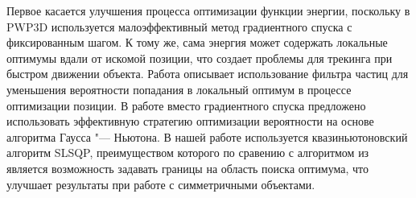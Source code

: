 Первое касается улучшения процесса оптимизации функции энергии, поскольку в
PWP3D используется малоэффективный метод градиентного спуска с фиксированным
шагом.
К тому же, сама энергия может содержать локальные оптимумы вдали от искомой
позиции, что создает проблемы для трекинга при быстром движении объекта.
Работа \cite{Zhao2014} описывает использование фильтра частиц для уменьшения
вероятности попадания в локальный оптимум в процессе оптимизации позиции.
В работе \cite{Tjaden2018} вместо градиентного спуска предложено использовать
эффективную стратегию оптимизации вероятности на основе алгоритма
Гаусса "--- Ньютона.
В нашей работе используется квазиньютоновский алгоритм SLSQP, преимуществом
которого по сравению с алгоритмом из \cite{Tjaden2018} является возможность
задавать границы на область поиска оптимума, что улучшает результаты при работе
с симметричными объектами.

